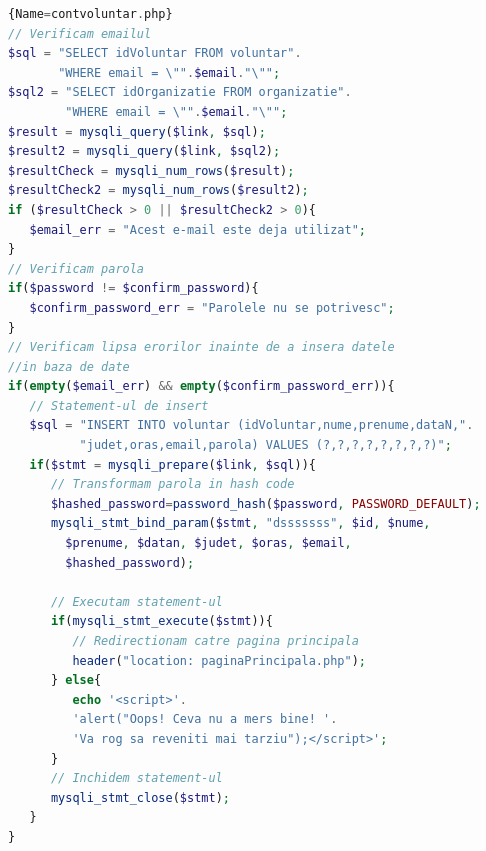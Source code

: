 \documentclass[12pt,a4paper]{report}
\begin{document}
\begin{lstlisting}[basicstyle=\small, language=PHP,caption=Secțiune de cod PHP responsabilă de înregistrare]{Name=contvoluntar.php}
// Verificam emailul
$sql = "SELECT idVoluntar FROM voluntar".
       "WHERE email = \"".$email."\"";
$sql2 = "SELECT idOrganizatie FROM organizatie".
        "WHERE email = \"".$email."\"";
$result = mysqli_query($link, $sql);
$result2 = mysqli_query($link, $sql2);
$resultCheck = mysqli_num_rows($result);
$resultCheck2 = mysqli_num_rows($result2);
if ($resultCheck > 0 || $resultCheck2 > 0){
   $email_err = "Acest e-mail este deja utilizat";
}
// Verificam parola
if($password != $confirm_password){
   $confirm_password_err = "Parolele nu se potrivesc";
}
// Verificam lipsa erorilor inainte de a insera datele 
//in baza de date
if(empty($email_err) && empty($confirm_password_err)){
   // Statement-ul de insert
   $sql = "INSERT INTO voluntar (idVoluntar,nume,prenume,dataN,".
          "judet,oras,email,parola) VALUES (?,?,?,?,?,?,?,?)";
   if($stmt = mysqli_prepare($link, $sql)){
      // Transformam parola in hash code
      $hashed_password=password_hash($password, PASSWORD_DEFAULT); 
      mysqli_stmt_bind_param($stmt, "dsssssss", $id, $nume, 
		$prenume, $datan, $judet, $oras, $email,
		$hashed_password);

      // Executam statement-ul
      if(mysqli_stmt_execute($stmt)){
         // Redirectionam catre pagina principala
         header("location: paginaPrincipala.php");
      } else{
         echo '<script>'.
         'alert("Oops! Ceva nu a mers bine! '.
         'Va rog sa reveniti mai tarziu");</script>';
      }
      // Inchidem statement-ul
      mysqli_stmt_close($stmt);
   }
}
\end{lstlisting}
\end{document}
